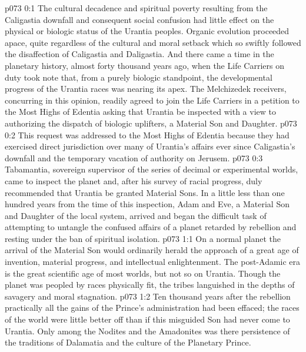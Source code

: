 \author{Solonia}
\vs p073 0:1 The cultural decadence and spiritual poverty resulting from the Caligastia downfall and consequent social confusion had little effect on the physical or biologic status of the Urantia peoples. Organic evolution proceeded apace, quite regardless of the cultural and moral setback which so swiftly followed the disaffection of Caligastia and Daligastia. And there came a time in the planetary history, almost forty thousand years ago, when the Life Carriers on duty took note that, from a purely biologic standpoint, the developmental progress of the Urantia races was nearing its apex. The Melchizedek receivers, concurring in this opinion, readily agreed to join the Life Carriers in a petition to the Most Highs of Edentia asking that Urantia be inspected with a view to authorizing the dispatch of biologic uplifters, a Material Son and Daughter.
\vs p073 0:2 This request was addressed to the Most Highs of Edentia because they had exercised direct jurisdiction over many of Urantia’s affairs ever since Caligastia’s downfall and the temporary vacation of authority on Jerusem.
\vs p073 0:3 Tabamantia, sovereign supervisor of the series of decimal or experimental worlds, came to inspect the planet and, after his survey of racial progress, duly recommended that Urantia be granted Material Sons. In a little less than one hundred years from the time of this inspection, Adam and Eve, a Material Son and Daughter of the local system, arrived and began the difficult task of attempting to untangle the confused affairs of a planet retarded by rebellion and resting under the ban of spiritual isolation.\plusone
{}%
\vs p073 1:1 On a normal planet the arrival of the Material Son would ordinarily herald the approach of a great age of invention, material progress, and intellectual enlightenment. The post\hyp{}Adamic era is the great scientific age of most worlds, but not so on Urantia. Though the planet was peopled by races physically fit, the tribes languished in the depths of savagery and moral stagnation.
\vs p073 1:2 Ten thousand years after the rebellion practically all the gains of the Prince’s administration had been effaced; the races of the world were little better off than if this misguided Son had never come to Urantia. Only among the Nodites and the Amadonites was there persistence of the traditions of Dalamatia and the culture of the Planetary Prince.
